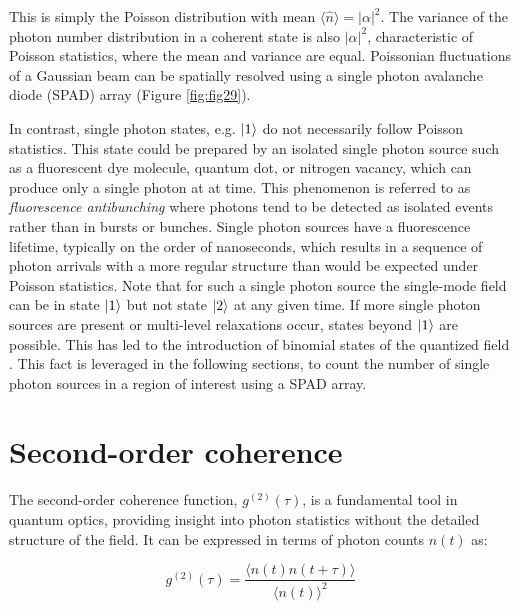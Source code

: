 This is simply the Poisson distribution with mean $\langle \hat{n} \rangle = \lvert\alpha\lvert^2$. The variance of the photon number distribution in a coherent state is also $\lvert\alpha\lvert^2$, characteristic of Poisson statistics, where the mean and variance are equal. Poissonian fluctuations of a Gaussian beam can be spatially resolved using a single photon avalanche diode (SPAD) array (Figure \ref{fig:fig29}).

In contrast, single photon states, e.g. $\ket{1}$ do not necessarily follow Poisson statistics. This state could be prepared by an isolated single photon source such as a fluorescent dye molecule, quantum dot, or nitrogen vacancy, which can produce only a single photon at at time. This phenomenon is referred to as \emph{fluorescence antibunching} where photons tend to be detected as isolated events rather than in bursts or bunches. Single photon sources have a fluorescence lifetime, typically on the order of nanoseconds, which results in a sequence of photon arrivals with a more regular structure than would be expected under Poisson statistics. Note that for such a single photon source the single-mode field can be in state $\ket{1}$ but not state $\ket{2}$ at any given time. If more single photon sources are present or multi-level relaxations occur, states beyond $\ket{1}$ are possible. This has led to the introduction of binomial states of the quantized field \parencite{Stoler1985}. This fact is leveraged in the following sections, to count the number of single photon sources in a region of interest using a SPAD array.

\section{Second-order coherence}

The second-order coherence function, $ g^{(2)}(\tau) $, is a fundamental tool in quantum optics, providing insight into photon statistics without the detailed structure of the field. It can be expressed in terms of photon counts $ n(t) $ as:

\begin{equation}
g^{(2)}(\tau) = \frac{\langle n(t) n(t+\tau) \rangle}{\langle n(t) \rangle^2}
\end{equation}

